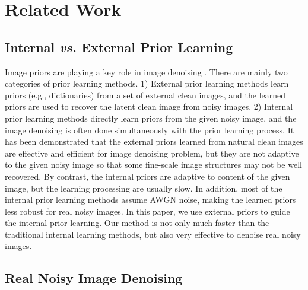 \documentclass[10pt,twocolumn,letterpaper]{article}
\begin{document}
\section{Related Work}

\subsection{Internal \textbf{\emph{vs.}} External Prior Learning}

Image priors are playing a key role in image denoising \cite{pgpd,epll,ksvd,ple,ncsr,iraniinternal}. There are mainly two categories of prior learning methods. 1) External prior learning methods \cite{foe,pgpd,epll} learn priors (e.g., dictionaries) from a set of external clean images, and the learned priors are used to recover the latent clean image from noisy images. 2) Internal prior learning methods \cite{ksvd,ncsr,ple,iraniinternal} directly learn priors from the given noisy image, and the image denoising is often done simultaneously with the prior learning process. It has been demonstrated \cite{pgpd,epll} that the external priors learned from natural clean images are effective and efficient for image denoising problem, but they are not adaptive to the given noisy image so that some fine-scale image structures may not be well recovered. By contrast, the internal priors are adaptive to content of the given image, but the learning processing are usually slow. In addition, most of the internal prior learning methods \cite{ksvd,ncsr,ple,iraniinternal} assume AWGN noise, making the learned priors less robust for real noisy images. 
In this paper, we use external priors to guide the internal prior learning. Our method is not only much faster than the traditional internal learning methods, but also very effective to denoise real noisy images.

\subsection{Real Noisy Image Denoising}
\end{document}
